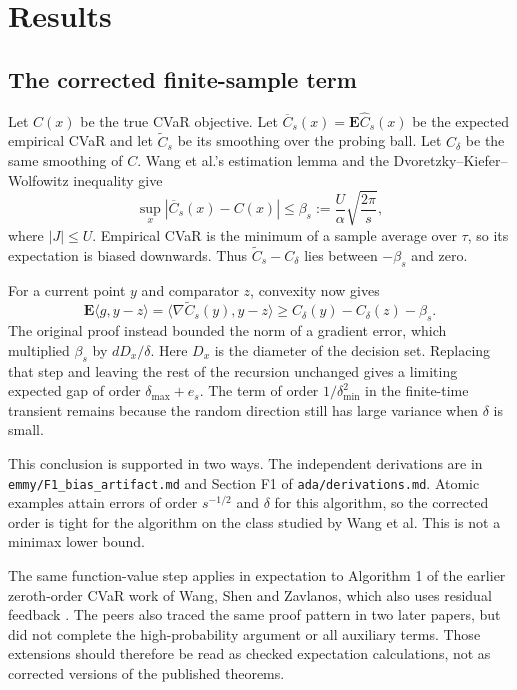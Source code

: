 \documentclass{article}
\newcommand{\E}{\mathbf{E}}
\begin{document}
\section{Results}

\subsection{The corrected finite-sample term}

Let $C(x)$ be the true CVaR objective. Let $\overline C_s(x)=\E\widehat C_s(x)$ be the expected empirical CVaR and let $\widetilde C_s$ be its smoothing over the probing ball. Let $C_\delta$ be the same smoothing of $C$. Wang et al.'s estimation lemma and the Dvoretzky--Kiefer--Wolfowitz inequality give
\begin{equation}
 \sup_x|\overline C_s(x)-C(x)|\leq
 \beta_s:=\frac U\alpha\sqrt{\frac{2\pi}{s}},
 \label{eq:beta}
\end{equation}
where $|J|\leq U$. Empirical CVaR is the minimum of a sample average over $\tau$, so its expectation is biased downwards. Thus $\widetilde C_s-C_\delta$ lies between $-\beta_s$ and zero.

For a current point $y$ and comparator $z$, convexity now gives
\begin{equation}
 \E\langle g,y-z\rangle
 =\langle\nabla\widetilde C_s(y),y-z\rangle
 \geq C_\delta(y)-C_\delta(z)-\beta_s.
 \label{eq:key}
\end{equation}
The original proof instead bounded the norm of a gradient error, which multiplied $\beta_s$ by $dD_x/\delta$. Here $D_x$ is the diameter of the decision set. Replacing that step and leaving the rest of the recursion unchanged gives a limiting expected gap of order $\delta_{\max}+e_s$. The term of order $1/\delta_{\min}^2$ in the finite-time transient remains because the random direction still has large variance when $\delta$ is small.

This conclusion is supported in two ways. The independent derivations are in \texttt{emmy/F1\_bias\_artifact.md} and Section F1 of \texttt{ada/derivations.md}. Atomic examples attain errors of order $s^{-1/2}$ and $\delta$ for this algorithm, so the corrected order is tight for the algorithm on the class studied by Wang et al. This is not a minimax lower bound.

The same function-value step applies in expectation to Algorithm 1 of the earlier zeroth-order CVaR work of Wang, Shen and Zavlanos, which also uses residual feedback \cite{wang2022risk}. The peers also traced the same proof pattern in two later papers, but did not complete the high-probability argument or all auxiliary terms. Those extensions should therefore be read as checked expectation calculations, not as corrected versions of the published theorems.
\end{document}
